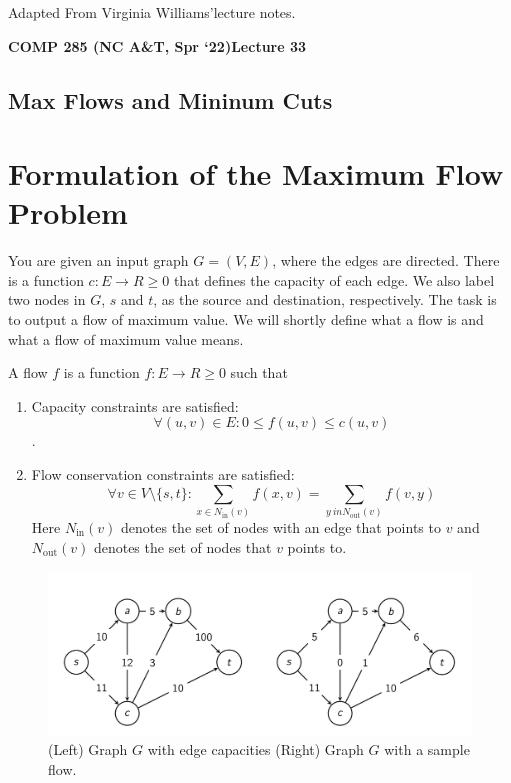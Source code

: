 \documentclass [12pt]{article}
\theoremstyle{definition}
\begin{document}
 

\vspace {1em} 
\begin {Instruction} 
Adapted From Virginia Williams'lecture notes.
\end {Instruction}  

{\LARGE \textbf {COMP 285 (NC A\&T, Spr `22)}\hfill \textbf {Lecture 33} } 

\begin{centering}
\section*{Max Flows and Mininum Cuts}
\end{centering}


\section{Formulation of the Maximum Flow Problem}

You are given an input graph $G = (V, E)$, where the edges are directed. There is a function $c : E \to R\geq 0$ that defines the capacity of each edge. We also label two nodes in $G$, $s$ and $t$, as the source and destination, respectively. The task is to output a flow of maximum value. We will shortly define what a flow is and what a flow of maximum value means. 

A flow $f$ is a function $f : E \to R\geq 0$ such that 
\begin{enumerate}
    \item Capacity constraints are satisfied: 
    $$
        \forall (u, v ) \in E : 0 \leq f (u, v ) \leq c(u, v )
    $$. 
    \item Flow conservation constraints are satisfied: 
    $$
    \forall v \in V \setminus \{s, t\} : \sum_{x \in N_{\text{in}}(v)} f (x, v ) = \sum_{y\ in N_{\text{out}}(v)} f (v, y )
    $$
    Here $N_{\text{in}}(v )$ denotes the set of nodes with an edge that points to $v$ and $N_{\text{out}}(v )$ denotes the set of nodes that $v$ points to.
\end{enumerate}

\begin{figure}[h!]
    \centering
    \includegraphics[scale=0.6]{max_flow_ex.png}
    \caption{(Left) Graph $G$ with edge capacities (Right) Graph $G$ with a sample flow.}
    \label{fig:max_flow_ex}
\end{figure}
 
\end{document}

